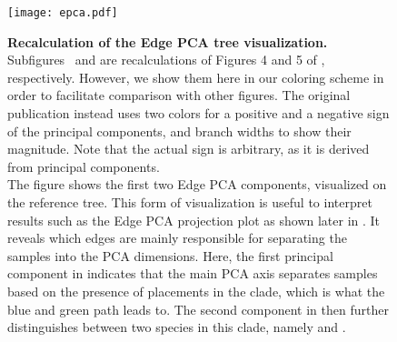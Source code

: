 \begin{figure}[pbt]
    \centering
    \vspace*{1em}
    \texttt{[image: epca.pdf]}
    \vspace*{-1em}
    \begin{subfigure}{0pt}
        \label{fig:epca:sub:comp1}
    \end{subfigure}
    \begin{subfigure}{0pt}
        \label{fig:epca:sub:comp2}
    \end{subfigure}
    \caption[Recalculation of the Edge PCA tree visualization]{
        \textbf{Recalculation of the Edge PCA tree visualization.}
        Subfigures~ and  are recalculations
        of Figures 4 and 5 of , respectively.
        However, we show them here in our coloring scheme in order to facilitate comparison with other figures.
        The original publication instead uses two colors for a positive and a negative sign of the principal components,
        and branch widths to show their magnitude.
        Note that the actual sign is arbitrary, as it is derived from principal components.
        \\
        The figure shows the first two Edge PCA components, visualized on the reference tree.
        This form of visualization is useful to interpret results such as the Edge PCA projection plot
        as shown later in .
        It reveals which edges are mainly responsible for separating the samples into the PCA dimensions.
        Here, the first principal component in  indicates that the main PCA axis
        separates samples based on the presence of placements in the  clade,
        which is what the blue and green path leads to.
        The second component in  then further distinguishes between two species
        in this clade, namely  and .
    }
    \label{fig:epca}
\end{figure}


